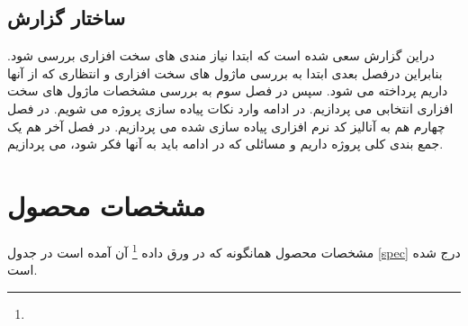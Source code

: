 \documentclass{article}
\begin{document}
\subsection{ساختار گزارش}
دراین گزارش سعی شده است که ابتدا نیاز مندی های سخت افزاری بررسی شود. بنابراین درفصل بعدی ابتدا به بررسی ماژول های سخت افزاری و انتظاری که از آنها داریم پرداخته می شود. سپس در فصل سوم به بررسی مشخصات ماژول های سخت افزاری انتخابی می پردازیم. در ادامه وارد نکات پیاده سازی پروژه می شویم. در فصل چهارم هم به آنالیز کد نرم افزاری پیاده سازی شده می پردازیم. در فصل آخر هم یک جمع بندی کلی پروژه داریم و مسائلی که در ادامه باید به آنها فکر شود، می پردازیم.


\section{مشخصات محصول}
مشخصات محصول همانگونه که در ورق داده \footnote{} آن آمده است در جدول \ref{spec} درج شده است.

\end{document}
